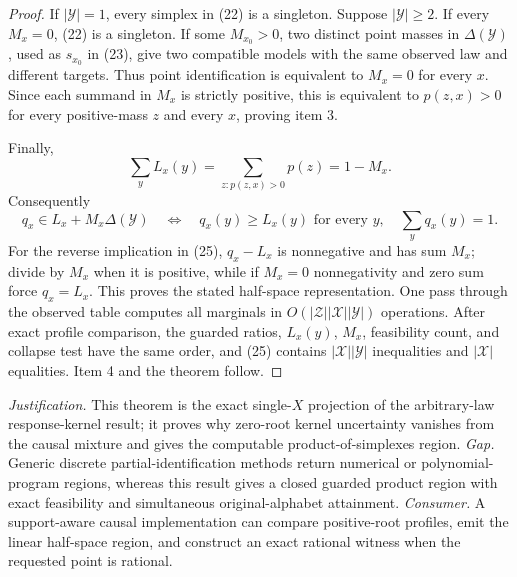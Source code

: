 \documentclass{article}
\begin{document}
\begin{proof}
If \(|\mathcal Y|=1\), every simplex in (22) is a singleton.  Suppose
\(|\mathcal Y|\geq2\).  If every \(M_x=0\), (22) is a singleton.  If
some \(M_{x_0}>0\), two distinct point masses in
\(\Delta(\mathcal Y)\), used as \(s_{x_0}\) in (23), give two compatible
models with the same observed law and different targets.  Thus point
identification is equivalent to \(M_x=0\) for every \(x\).  Since each
summand in \(M_x\) is strictly positive, this is equivalent to
\(p(z,x)>0\) for every positive-mass \(z\) and every \(x\), proving item
3.

Finally,
\[
 \sum_yL_x(y)=\sum_{z:p(z,x)>0}p(z)=1-M_x.
\tag{24}
\]
Consequently
\[
 q_x\in L_x+M_x\Delta(\mathcal Y)
 \quad\Longleftrightarrow\quad
 q_x(y)\geq L_x(y)\text{ for every }y,
 \quad \sum_yq_x(y)=1.
\tag{25}
\]
For the reverse implication in (25), \(q_x-L_x\) is nonnegative and has
sum \(M_x\); divide by \(M_x\) when it is positive, while if \(M_x=0\)
nonnegativity and zero sum force \(q_x=L_x\).  This proves the stated
half-space representation.  One pass through the observed table computes
all marginals in
\(O(|\mathcal Z||\mathcal X||\mathcal Y|)\) operations.  After exact
profile comparison, the guarded ratios, \(L_x(y)\), \(M_x\), feasibility
count, and collapse test have the same order, and (25) contains
\(|\mathcal X||\mathcal Y|\) inequalities and \(|\mathcal X|\)
equalities.  Item 4 and the theorem follow.
\end{proof}
\par\smallskip\noindent \textit{Justification.} This theorem is the exact single-\(X\) projection of the arbitrary-law response-kernel result; it proves why zero-root kernel uncertainty vanishes from the causal mixture and gives the computable product-of-simplexes region. \textit{Gap.} Generic discrete partial-identification methods return numerical or polynomial-program regions, whereas this result gives a closed guarded product region with exact feasibility and simultaneous original-alphabet attainment. \textit{Consumer.} A support-aware causal implementation can compare positive-root profiles, emit the linear half-space region, and construct an exact rational witness when the requested point is rational.
\end{document}
